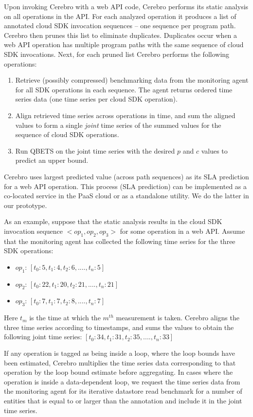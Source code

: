 Upon invoking Cerebro with a web API code, Cerebro
performs its static analysis on all operations in the API. For each
analyzed operation it produces a list of annotated cloud SDK invocation sequences --
one sequence per program path. Cerebro then prunes this list to eliminate duplicates.
Duplicates occur when a web API operation has
multiple program paths with the same sequence of cloud SDK invocations.
Next, for each pruned list Cerebro performs the following operations:
\begin{enumerate}
\item Retrieve (possibly compressed) benchmarking data from the monitoring agent 
for all SDK operations in each sequence. The agent returns
ordered time series data (one time series per cloud SDK operation).
\item Align retrieved time series across operations in time, and sum the aligned
values
to form a single \textit{joint} time series of the summed values for the 
sequence of cloud SDK operations.
\item Run QBETS on the joint time series with the 
desired $p$ and $c$ values to predict an upper bound. 
\end{enumerate}
Cerebro uses largest predicted value (across path sequences) 
as its SLA prediction for a web API operation.
This process (SLA prediction) can be implemented
as a co-located service in the PaaS cloud or as a standalone utility.  We do 
the latter in our prototype.

As an example, suppose that the static analysis results in the
cloud SDK invocation sequence $<op_{1},op_{2},op_{3}>$ for
some operation in a web API. 
Assume that the monitoring agent has collected the following
time series for the three SDK operations:
\begin{itemize}
\item $op_{1}$: $[t_{0}: 5, t_{1}: 4, t_{2}: 6, ...., t_{n}: 5]$
\item $op_{2}$: $[t_{0}: 22, t_{1}: 20, t_{2}: 21, ...., t_{n}: 21]$
\item $op_{3}$: $[t_{0}: 7, t_{1}: 7, t_{2}: 8, ...., t_{n}: 7]$
\end{itemize}

Here $t_{m}$ is the time at which the $m^{th}$ measurement is taken.
Cerebro aligns the three time series according to timestamps, 
and sums the values
to obtain the following joint time series:
$[t_{0}: 34, t_{1}: 31, t_{2}: 35, ...., t_{n}: 33]$

If any operation is tagged as being inside a loop, where the loop
bounds have been estimated, Cerebro multiplies
the time series data corresponding to that 
operation by the loop bound estimate before aggregating. In cases where the operation 
is inside a data-dependent loop, we request the time series data from 
the monitoring agent for its iterative datastore read benchmark 
for a number of entities that is equal to or larger than the annotation
and include it in the joint time series.

